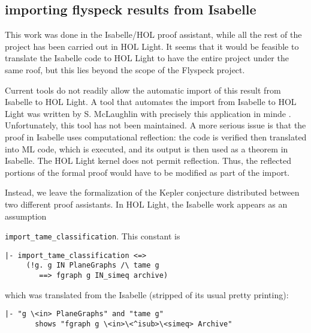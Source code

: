 \subsection{importing flyspeck results from Isabelle}


This work was done in the Isabelle/HOL proof assistant, while all the
rest of the project has been carried out in HOL Light.  It seems that
it would be feasible to translate the Isabelle code to HOL Light to
have the entire project under the same roof, but this lies beyond the
scope of the Flyspeck project.

Current tools do not readily allow the automatic import of this result
from Isabelle to HOL Light.  A tool that automates the import from
Isabelle to HOL Light was written by S. McLaughlin with precisely this
application in minde \cite{XX}.  Unfortunately, this tool has not been
maintained.   A more serious issue is that the proof in
Isabelle uses computational reflection: 
the code is verified then translated into ML code, which is executed,
and its output is then used as a theorem in Isabelle.
The HOL Light kernel does not permit reflection.
Thus, the reflected portions of the formal proof would have to be
modified as part of the import.

Instead, we leave the formalization of the Kepler conjecture
distributed between two different proof assistants.  In HOL Light, the
Isabelle work appears as an assumption

\verb!import_tame_classification!.  This constant is 


\begin{obeylines}

\begin{verbatim}
|- import_tame_classification <=>
     (!g. g IN PlaneGraphs /\ tame g 
        ==> fgraph g IN_simeq archive)
\end{verbatim}

\end{obeylines}

which was translated from the Isabelle (stripped of its usual pretty printing):

\begin{obeylines}

\begin{verbatim}
|- "g \<in> PlaneGraphs" and "tame g" 
       shows "fgraph g \<in>\<^isub>\<simeq> Archive"
\end{verbatim}

\end{obeylines}



